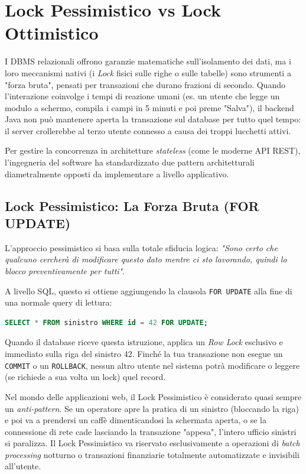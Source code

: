 \section{Lock Pessimistico vs Lock Ottimistico}

I DBMS relazionali offrono garanzie matematiche sull'isolamento dei dati, ma i loro meccanismi nativi (i \textit{Lock} fisici sulle righe o sulle tabelle) sono strumenti a "forza bruta", pensati per transazioni che durano frazioni di secondo. 
Quando l'interazione coinvolge i tempi di reazione umani (es. un utente che legge un modulo a schermo, compila i campi in 5 minuti e poi preme "Salva"), il backend Java non può mantenere aperta la transazione sul database per tutto quel tempo: il server crollerebbe al terzo utente connesso a causa dei troppi lucchetti attivi.

Per gestire la concorrenza in architetture \textit{stateless} (come le moderne API REST), l'ingegneria del software ha standardizzato due pattern architetturali diametralmente opposti da implementare a livello applicativo.

\subsection{Lock Pessimistico: La Forza Bruta (FOR UPDATE)}

L'approccio pessimistico si basa sulla totale sfiducia logica: \textit{"Sono certo che qualcuno cercherà di modificare questo dato mentre ci sto lavorando, quindi lo blocco preventivamente per tutti"}.

A livello SQL, questo si ottiene aggiungendo la clausola \texttt{FOR UPDATE} alla fine di una normale query di lettura:
\begin{lstlisting}[language=SQL, basicstyle=\ttfamily\small, keywordstyle=\color{blue}\bfseries]
SELECT * FROM sinistro WHERE id = 42 FOR UPDATE;
\end{lstlisting}

Quando il database riceve questa istruzione, applica un \textit{Row Lock} esclusivo e immediato sulla riga del sinistro 42. Finché la tua transazione non esegue un \texttt{COMMIT} o un \texttt{ROLLBACK}, nessun altro utente nel sistema potrà modificare o leggere (se richiede a sua volta un lock) quel record. 

\begin{warningbox}
Nel mondo delle applicazioni web, il Lock Pessimistico è considerato quasi sempre un \textit{anti-pattern}. Se un operatore apre la pratica di un sinistro (bloccando la riga) e poi va a prendersi un caffè dimenticandosi la schermata aperta, o se la connessione di rete cade lasciando la transazione "appesa", l'intero ufficio sinistri si paralizza. Il Lock Pessimistico va riservato esclusivamente a operazioni di \textit{batch processing} notturno o transazioni finanziarie totalmente automatizzate e invisibili all'utente.
\end{warningbox}

